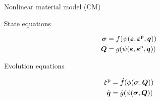 \documentclass{beamer}
\begin{document}
{\begin{block}{ \centering Nonlinear material model (CM)}
\end{block}
\vspace{-0.5cm}
\begin{minipage}[t]{0.4\textwidth}
\begin{itemize}
{\item State equations}
\centering
\vspace{-0.3cm}
\begin{equation*}
\begin{split}
\mbox{\boldmath $\sigma$} &= f(\psi(\mbox{\boldmath $\varepsilon $},\mbox{\boldmath $\varepsilon $}^{\rm{p}},\mbox{\boldmath $ q$})) \\ 
\mbox{\boldmath $ Q$} &= g(\psi(\mbox{\boldmath $\varepsilon $},\mbox{\boldmath $\varepsilon $}^{\rm{p}},\mbox{\boldmath $ q$}))
\end{split}
\end{equation*}
\end{itemize}
\end{minipage}\hfil\begin{minipage}[t]{0.5\textwidth}
\begin{itemize}
{\item Evolution equations}
\centering
\vspace{-0.3cm}
\begin{equation*}
\begin{split}
{\dot{\mbox{\boldmath $\varepsilon $}}}^{\rm p} &= \hat{f}{(\phi(\mbox{\boldmath $\sigma$},\mbox{\boldmath $ Q$}))} \\
\dot{\mbox{\boldmath $ q$}} &= \hat{g}{(\phi(\mbox{\boldmath $\sigma$},\mbox{\boldmath $ Q$}))}
\end{split}
\end{equation*}
\end{itemize}
\end{minipage}

}
\end{document}
